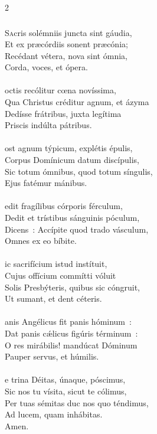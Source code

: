 \documentclass[9pt,twoside]{extarticle}
\begin{document}
\begin{multicols}{2}
\subsubsection*{\center{}}
\lettrine{S}acris solémniis juncta sint gáudia,\\ Et ex præcórdiis sonent præcónia;\\ Recédant vétera, nova sint ómnia,\\ Corda, voces, et ópera.\\
\\
octis recólitur cœna novíssima,\\ Qua Christus créditur agnum, et ázyma\\ Dedísse frátribus, juxta legítima\\ Priscis indúlta pátribus.\\
\\
ost agnum týpicum, explétis épulis,\\ Corpus Domínicum datum discípulis,\\ Sic totum ómnibus, quod totum síngulis,\\ Ejus fatémur mánibus.\\
\\
edit fragílibus córporis férculum,\\ Dedit et trístibus sánguinis póculum,\\ Dicens~: Accípite quod trado vásculum,\\ Omnes ex eo bíbite.\\
\\
ic sacrifícium istud instítuit,\\ Cujus offícium commítti vóluit\\ Solis Presbýteris, quibus sic cóngruit,\\ Ut sumant, et dent céteris.\\
\\
anis Angélicus fit panis hóminum~:\\ Dat panis cǽlicus figúris términum~:\\ O res mirábilis! mandúcat Dóminum\\ Pauper servus, et húmilis.\\
\\
e trina Déitas, únaque, póscimus,\\ Sic nos tu vísita, sicut te cólimus,\\ Per tuas sémitas duc nos quo téndimus,\\ Ad lucem, quam inhábitas.\\
Amen.

\end{multicols}
\end{document}

